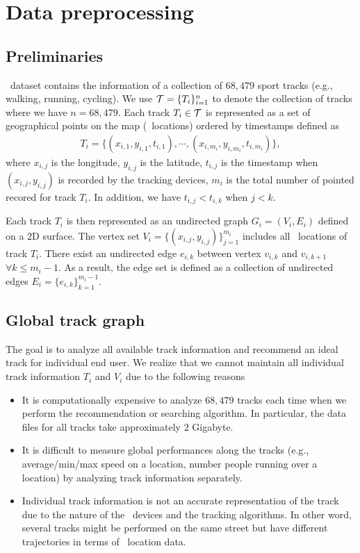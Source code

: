 
\section{Data preprocessing}

\subsection{Preliminaries}

\edmd\ dataset contains the information of a collection of $68,479$ sport tracks (e.g., walking, running, cycling).
We use $\mathcal{T}=\{T_i\}_{i=1}^n$ to denote the collection of tracks where we have $n=68,479$.
Each track $T_i\in\mathcal{T}$ is represented as a set of geographical points on the map (\gps\ locations) ordered by timestamps defined as
\begin{align*}
	T_i = \{(x_{i,1},y_{i,1},t_{i,1}),\cdots,(x_{i,m_i},y_{i,m_i},t_{i,m_i})\},
\end{align*}
where $x_{i,j}$ is the longitude, $y_{i,j}$ is the latitude, $t_{i,j}$ is the timestamp when $(x_{i,j},y_{i,j})$ is recorded by the tracking devices, $m_i$ is the total number of pointed recored for track $T_i$.
In addition, we have $t_{i,j}<t_{i,k}$ when $j<k$.

Each track $T_i$ is then represented as an undirected graph $G_i = (V_i,E_i)$ defined on a $2$D surface.
The vertex set $V_i=\{(x_{i,j},y_{i,j})\}_{j=1}^{m_i}$ includes all \gps\ locations of track $T_i$.
There exist an undirected edge $e_{i,k}$ between vertex $v_{i,k}$ and $v_{i,k+1}$ $\forall k\le m_i-1$.
As a result, the edge set is defined as a collection of undirected edges $E_i = \{e_{i,k}\}_{k=1}^{m_i-1}$.

\subsection{Global track graph}

The goal is to analyze all available track information and recommend an ideal track for individual end user.
We realize that we cannot maintain all individual track information $T_i$ and $V_i$ due to the following reasons
\begin{itemize}
	\item It is computationally expensive to analyze $68,479$ tracks each time when we perform the recommendation or searching algorithm. In particular, the data files for all tracks take approximately $2$ Gigabyte.
	\item It is difficult to measure global performances along the tracks (e.g., average/min/max speed on a location, number people running over a location) by analyzing track information separately. 
	\item Individual track information is not an accurate representation of the track due to the nature of the \gps\ devices and the tracking algorithms. In other word, several tracks might be performed on the same street but have different trajectories in terms of \gps\ location data. 
\end{itemize} 

